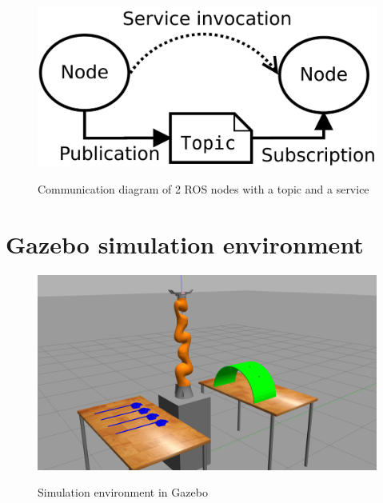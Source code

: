 \begin{center}
\begin{figure}[H]
\centering
\includegraphics{images/ROS_basic_concepts_topics_nodes.png}\\
\caption{Communication diagram of 2 ROS nodes with a topic and a service}
\end{figure}
\end{center}


\section{Gazebo simulation environment}

\begin{center}
\begin{figure}[H]
\centering
\includegraphics[width=12cm]{images/gazebo-sim1.png}\\
\caption{Simulation environment in Gazebo}
\end{figure}
\end{center}

